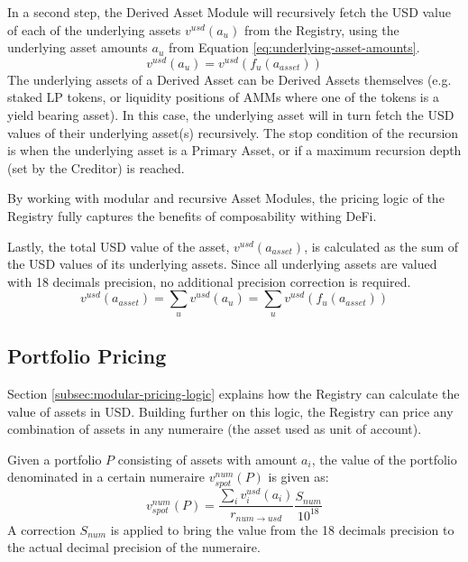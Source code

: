 \documentclass[sigconf,nonacm]{acmart}
\begin{document}
In a second step, the Derived Asset Module will recursively fetch the USD value of each of the underlying assets $v^{usd}(a_{u})$ from the Registry,
using the underlying asset amounts $a_{u}$ from Equation \ref{eq:underlying-asset-amounts}.
\begin{equation}
    v^{usd}(a_{u}) = v^{usd}(f_{u}(a_{asset}))
\end{equation}
The underlying assets of a Derived Asset can be Derived Assets themselves (e.g. staked LP tokens, or liquidity positions of AMMs where one of the tokens is a yield bearing asset).
In this case, the underlying asset will in turn fetch the USD values  of their underlying asset(s) recursively.
The stop condition of the recursion is when the underlying asset is a Primary Asset, or if a maximum recursion depth (set by the Creditor) is reached.

By working with modular and recursive Asset Modules, the pricing logic of the Registry fully captures the benefits of composability withing DeFi.

Lastly, the total USD value of the asset, $v^{usd}(a_{asset})$, is calculated as the sum of the USD values of its underlying assets.
Since all underlying assets are valued with 18 decimals precision, no additional precision correction is required.
\begin{equation}
    v^{usd}(a_{asset}) = \sum_{u}{v^{usd}(a_{u})} = \sum_{u}{v^{usd}(f_{u}(a_{asset}))}
\end{equation}

\subsection{Portfolio Pricing}
\label{subsec:portfolio-pricing}
Section \ref{subsec:modular-pricing-logic} explains how the Registry can calculate the value of assets in USD.
Building further on this logic, the Registry can price any combination of assets in any numeraire (the asset used as unit of account).

Given a portfolio $P$ consisting of assets with amount $a_{i}$, the value of the portfolio denominated in a certain numeraire $v_{spot}^{num}(P)$ is given as:
\begin{equation}
    \label{eq:portfolio-value-mtm}
    v_{spot}^{num}(P) = \frac{\sum_{i}{v^{usd}_{i}(a_{i})}}{r_{num\rightarrow usd}}\frac{S_{num}}{10^{18}}
\end{equation}
A correction $S_{num}$ is applied to bring the value from the 18 decimals precision to the actual decimal precision of the numeraire.
\end{document}
